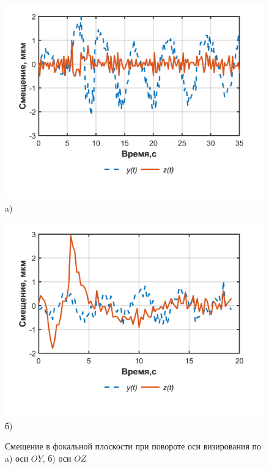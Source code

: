  \begin{figure}[!h]
 	\begin{minipage}[b][][b]{0.49\linewidth}\centering
 		\includegraphics[width=1\linewidth]{matlab/img/biasY.png} \\ a)
 	\end{minipage}
 	\hfill
 	\begin{minipage}[b][][b]{0.49\linewidth}\centering
 		\includegraphics[width=1\linewidth]{matlab/img/biasZ.png} \\ б)
 	\end{minipage}
 	\caption{Смещение в фокальной плоскости при повороте оси визирования по a) оси $OY$, б) оси $OZ$ }
 	\label{fig:bias}
 \end{figure}
 
